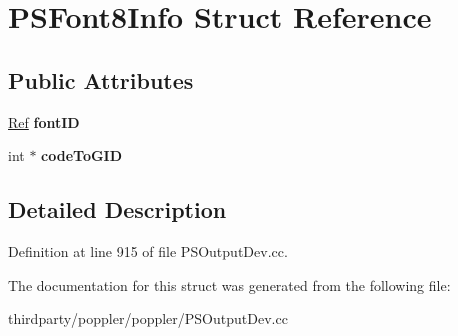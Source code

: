 \hypertarget{struct_p_s_font8_info}{}\section{P\+S\+Font8\+Info Struct Reference}
\label{struct_p_s_font8_info}
\subsection*{Public Attributes}
\begin{DoxyCompactItemize}
\item 
\mbox{\label{struct_p_s_font8_info_ac87ec4bb0abd29e802c727ec3e10f52a}} 
\hyperlink{struct_ref}{Ref} {\bfseries font\+ID}
\item 
\mbox{\label{struct_p_s_font8_info_a4ddf7043710cc4b58d78a13ba0e97d37}} 
int $\ast$ {\bfseries code\+To\+G\+ID}
\end{DoxyCompactItemize}


\subsection{Detailed Description}


Definition at line 915 of file P\+S\+Output\+Dev.\+cc.



The documentation for this struct was generated from the following file\+:\begin{DoxyCompactItemize}
\item 
thirdparty/poppler/poppler/P\+S\+Output\+Dev.\+cc\end{DoxyCompactItemize}
